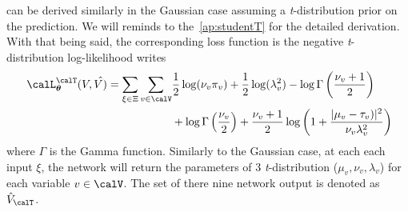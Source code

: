  can be derived similarly in the Gaussian case assuming a \textit{t}-distribution prior on the prediction.
We will reminds to the~\cref{ap:studentT} for the detailed derivation.
With that being said, the corresponding loss function is the negative \textit{t}-distribution log-likelihood writes
\begin{equation}
    \begin{split}
    \ \calL_{\params}^{\calT}(V, \hat{V)} =
                         \sum_{\xi\in\Xi} \sum_{v\in \calV}
                        &    \dfrac{1}{2} \log (\nu_v\pi_v)
                           + \dfrac{1}{2} \log(\lambda_v^2)
                           - \log  \Gamma \left( \dfrac{\nu_v+1}{2} \right)\\
                        &  + \log  \Gamma \left( \dfrac{\nu_v}{2} \right)
                           + \dfrac{\nu_v+1}{2} \log \left( 1  + \dfrac{\powerOf{\mu_v - \tau_v)}}{\nu_v \lambda_v^2} \right)\\
    \end{split}
\end{equation}
where $\Gamma$ is the Gamma function.
Similarly to the Gaussian case, at each each input $\xi$, the network will return the parameters of 3 \textit{t}-distribution ($\mu_v, \nu_v, \lambda_v$) for each variable $v\in\calV$.
The set of there nine network output is denoted as $\hat{V}_{\calT}$.

